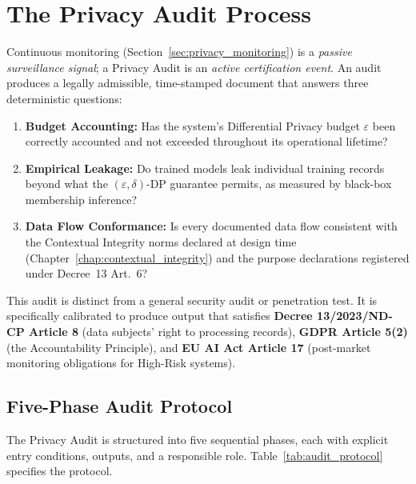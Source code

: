 \section{The Privacy Audit Process}
\label{sec:privacy_audit}

Continuous monitoring (Section~\ref{sec:privacy_monitoring}) is a \emph{passive surveillance signal}; a Privacy Audit is an \emph{active certification event}. An audit produces a legally admissible, time-stamped document that answers three deterministic questions:

\begin{enumerate}
  \item \textbf{Budget Accounting:} Has the system's Differential Privacy budget $\varepsilon$ been correctly accounted and not exceeded throughout its operational lifetime?
  \item \textbf{Empirical Leakage:} Do trained models leak individual training records beyond what the $(\varepsilon, \delta)$-DP guarantee permits, as measured by black-box membership inference?
  \item \textbf{Data Flow Conformance:} Is every documented data flow consistent with the Contextual Integrity norms declared at design time (Chapter~\ref{chap:contextual_integrity}) and the purpose declarations registered under Decree~13 Art.~6?
\end{enumerate}

This audit is distinct from a general security audit or penetration test. It is specifically calibrated to produce output that satisfies \textbf{Decree 13/2023/ND-CP Article 8} (data subjects' right to processing records), \textbf{GDPR Article 5(2)} (the Accountability Principle), and \textbf{EU AI Act Article 17} (post-market monitoring obligations for High-Risk systems).

\subsection{Five-Phase Audit Protocol}
\label{subsec:audit_protocol}

The Privacy Audit is structured into five sequential phases, each with explicit entry conditions, outputs, and a responsible role. Table~\ref{tab:audit_protocol} specifies the protocol.

